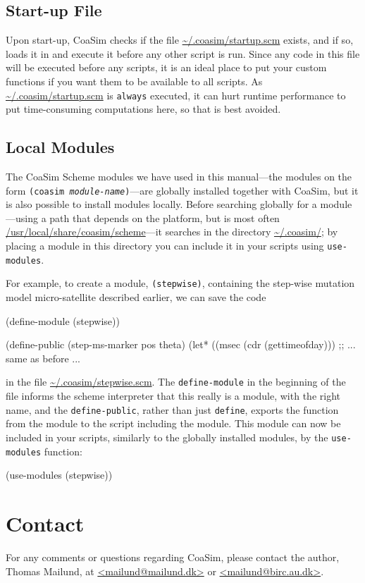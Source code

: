 \documentclass{manual}
\begin{document}
\subsection{Start-up File}
\label{sec:start-up-file}

Upon start-up, CoaSim checks if the file \url{~/.coasim/startup.scm}
exists, and if so, loads it in and execute it before any other script
is run.  Since any code in this file will be executed before any
scripts, it is an ideal place to put your custom functions if you want
them to be available to all scripts.  As \url{~/.coasim/startup.scm}
is \texttt{always} executed, it can hurt runtime performance to put
time-consuming computations here, so that is best avoided.


\subsection{Local Modules}
\label{sec:local-modules}

The CoaSim Scheme modules we have used in this manual---the modules on
the form \texttt{(coasim \emph{module-name})}---are globally installed
together with CoaSim, but it is also possible to install modules
locally.  Before searching globally for a module---using a path that
depends on the platform, but is most often
\url{/usr/local/share/coasim/scheme}---it searches in the directory
\url{~/.coasim/}; by placing a module in this directory you can
include it in your scripts using \texttt{use-modules}.

For example, to create a module, \texttt{(stepwise)}, containing the
step-wise mutation model micro-satellite described earlier, we can
save the code
\begin{code}
(define-module (stepwise))

(define-public (step-ms-marker pos theta)
  (let* ((msec (cdr (gettimeofday)))
  ;; ... same as before ...
\end{code}
in the file \url{~/.coasim/stepwise.scm}.  The \texttt{define-module}
in the beginning of the file informs the scheme interpreter that this
really is a module, with the right name, and the
\texttt{define-public}, rather than just \texttt{define}, exports the
function from the module to the script including the module.  This
module can now be included in your scripts, similarly to the globally
installed modules, by the \texttt{use-modules} function:
\begin{code}
(use-modules (stepwise))
\end{code}


\section{Contact}
\label{sec:contact}

For any comments or questions regarding CoaSim, please contact the
author, Thomas Mailund, at \url{<mailund@mailund.dk>} or
\url{<mailund@birc.au.dk>}.
\end{document}
